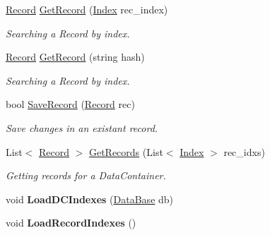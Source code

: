 \begin{DoxyCompactItemize}
\hyperlink{class_dwarf_d_b_1_1_data_structures_1_1_record}{Record} \hyperlink{class_dwarf_d_b_1_1_chunk_manager_1_1_chunk_manager_a188cdde83cc43cef01aabe0fd998f16f}{GetRecord} (\hyperlink{class_dwarf_d_b_1_1_data_structures_1_1_index}{Index} rec\_\-index)
\begin{DoxyCompactList}\small\item\em Searching a Record by index. \item\end{DoxyCompactList}\item 
\hyperlink{class_dwarf_d_b_1_1_data_structures_1_1_record}{Record} \hyperlink{class_dwarf_d_b_1_1_chunk_manager_1_1_chunk_manager_a12bbf90b25cfa5ee7861e20ef6319710}{GetRecord} (string hash)
\begin{DoxyCompactList}\small\item\em Searching a Record by index. \item\end{DoxyCompactList}\item 
bool \hyperlink{class_dwarf_d_b_1_1_chunk_manager_1_1_chunk_manager_ae2d3285067ca56d3f8bc0806f9e3904a}{SaveRecord} (\hyperlink{class_dwarf_d_b_1_1_data_structures_1_1_record}{Record} rec)
\begin{DoxyCompactList}\small\item\em Save changes in an existant record. \item\end{DoxyCompactList}\item 
List$<$ \hyperlink{class_dwarf_d_b_1_1_data_structures_1_1_record}{Record} $>$ \hyperlink{class_dwarf_d_b_1_1_chunk_manager_1_1_chunk_manager_a037839674d8248cade1ea666c9200d9f}{GetRecords} (List$<$ \hyperlink{class_dwarf_d_b_1_1_data_structures_1_1_index}{Index} $>$ rec\_\-idxs)
\begin{DoxyCompactList}\small\item\em Getting records for a DataContainer. \item\end{DoxyCompactList}\item 
\hypertarget{class_dwarf_d_b_1_1_chunk_manager_1_1_chunk_manager_aa6b67f87244adbc8d5ef5297950ac49c}{
void {\bfseries LoadDCIndexes} (\hyperlink{class_dwarf_d_b_1_1_data_structures_1_1_data_base}{DataBase} db)}
\label{class_dwarf_d_b_1_1_chunk_manager_1_1_chunk_manager_aa6b67f87244adbc8d5ef5297950ac49c}

\item 
\hypertarget{class_dwarf_d_b_1_1_chunk_manager_1_1_chunk_manager_a80aab988ea4c69f7abcfcd2015623a9c}{
void {\bfseries LoadRecordIndexes} ()}
\label{class_dwarf_d_b_1_1_chunk_manager_1_1_chunk_manager_a80aab988ea4c69f7abcfcd2015623a9c}


\end{DoxyCompactItemize}
